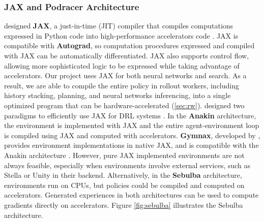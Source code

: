 \subsubsection{JAX and Podracer Architecture} \label{sec:jax_and_podracer}
\citeauthor{CompilingMachineLearning_Frostig.Johnson.ea_2019} designed \textbf{JAX}, a just-in-time (JIT) compiler that compiles computations expressed in Python code into high-performance accelerators code \cite{CompilingMachineLearning_Frostig.Johnson.ea_2019}.
JAX is compatible with \textbf{Autograd}, so computation procedures expressed and compiled with JAX can be automatically differentiated.
JAX also supports control flow, allowing more sophisticated logic to be expressed while taking advantage of accelerators.
Our project uses JAX for both neural networks and search.
As a result, we are able to compile the entire policy in rollout workers, including history stacking, planning, and neural networks inferencing, into a single optimized program that can be hardware-accelerated (\ref{sec:rw}).
\citeauthor{PodracerArchitecturesScalable_Hessel.Kroiss.ea_2021} designed two paradigms to efficiently use JAX for DRL systems \cite{PodracerArchitecturesScalable_Hessel.Kroiss.ea_2021}.
In the \textbf{Anakin} architecture, the environment is implemented with JAX and the entire agent-environment loop is compiled using JAX and computed with accelerators.
\textbf{Gymnax}, developed by \citeauthor{GymnaxJAXbasedReinforcement_RobertTjarkoLange_2022}, provides environment implementations in native JAX, and is compatible with the Anakin architecture \cite{GymnaxJAXbasedReinforcement_RobertTjarkoLange_2022}.
However, pure JAX implemented environments are not always feasible, especially when environments involve external services, such as Stella or Unity in their backend.
Alternatively, in the \textbf{Sebulba} architecture, environments run on CPUs, but policies could be compiled and computed on accelerators.
Generated experiences in both architectures can be used to compute gradients directly on accelerators.
Figure \ref{fig:sebulba} illustrates the Sebulba architecture.
